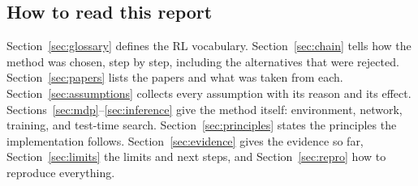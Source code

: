 \subsection{How to read this report}

Section~\ref{sec:glossary} defines the RL vocabulary. Section~\ref{sec:chain} tells how the method was chosen, step by step, including the alternatives that were rejected. Section~\ref{sec:papers} lists the papers and what was taken from each. Section~\ref{sec:assumptions} collects every assumption with its reason and its effect. Sections~\ref{sec:mdp}--\ref{sec:inference} give the method itself: environment, network, training, and test-time search. Section~\ref{sec:principles} states the principles the implementation follows. Section~\ref{sec:evidence} gives the evidence so far, Section~\ref{sec:limits} the limits and next steps, and Section~\ref{sec:repro} how to reproduce everything.
